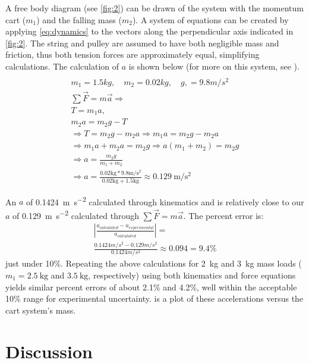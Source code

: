 \documentclass[reprint,amsmath,amssymb,aps,twoside]{revtex4-2}
\begin{document}
A free body diagram (see \cref{fig:2}) can be drawn of the system with the momentum cart ($m_1$) and the falling mass ($m_2$). A system of equations can be created by applying \cref{eq:dynamics} to the vectors along the perpendicular axis indicated in \cref{fig:2}. The string and pulley are assumed to have both negligible mass and friction, thus both tension forces are approximately equal, simplifying calculations. The calculation of $a$ is shown below (for more on this system, see \cite{tipler}).
\begin{gather*}
     \\m_1 = 1.5 kg, \quad m_2 = 0.02kg, \quad g , = 9.8m/s^2
    \\ \sum\vec{F}=m\vec{a}\Rightarrow
    \\T = m_1a, \tag{5}
    \\m_2a = m_2g - T \tag{6}
    \\ \Rightarrow T = m_2g - m_2a \Rightarrow m_1a =  m_2g - m_2a
    \\ \Rightarrow m_1a + m_2a = m_2g \Rightarrow a(m_1 + m_2) = m_2g 
    \\ \Rightarrow a = \frac{m_2g}{m_1 + m_2} \tag{7}
    \\ \Rightarrow a = \frac{0.02\text{kg}*9.8\text{m}/\text{s}^2}{0.02\text{kg}+1.5\text{kg}} \approx \qty{0.129}{\meter\per\second\squared} 
\end{gather*}

An $a$ of \qty{0.1424}{\meter\per\second\squared} calculated through kinematics and is relatively close to our $a$ of \qty{0.129}{\meter\per\second\squared} calculated through \(\sum\vec{F} = m\vec{a}\). The percent error is:
\begin{gather*}
    \left\lvert \frac{a_{calculated}-a_{experimental}}{a_{calculated}} \right\rvert = \tag{8}
    \\\frac{0.1424 m/s^2-0.129m/s^2}{0.1424 m/s^2} \approx 0.094 = 9.4\%
\end{gather*}
just under 10\%. Repeating the above calculations for \qty{2}{\kilo\gram} and \qty{3}{\kilo\gram} mass loads ($m_1=\qty{2.5}{\kilo\gram}$ and $\qty{3.5}{\kilo\gram}$, respectively) using both kinematics and force equations yields similar percent errors of about 2.1\% and 4.2\%, well within the acceptable 10\% range for experimental uncertainty.  is a plot of these accelerations versus the cart system's mass.






\section{Discussion}
\label{sec:discussion}
\end{document}

